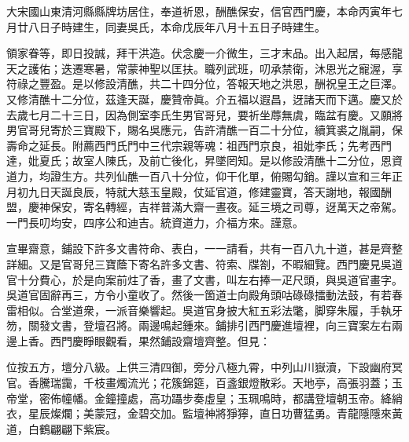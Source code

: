 \begin{myquote}[\markfont]
大宋國山東清河縣縣牌坊居住，奉道祈恩，酬醮保安，信官西門慶，本命丙寅年七月廿八日子時建生，同妻吳氏，本命戊辰年八月十五日子時建生。


領家眷等，即日投誠，拜干洪造。伏念慶一介微生，三才末品。出入起居，每感龍天之護佑；迭遷寒暑，常蒙神聖以匡扶。職列武班，叨承禁衛，沐恩光之寵渥，享符祿之豐盈。是以修設清醮，共二十四分位，答報天地之洪恩，酬祝皇王之巨澤。又修清醮十二分位，茲逢天誕，慶贊帝眞。介五福以遐昌，迓諸天而下邁。慶又於去歲七月二十三日，因為側室李氏生男官哥兒，要祈坐蓐無虞，臨盆有慶。又願將男官哥兒寄於三寶殿下，賜名吳應元，告許清醮一百二十分位，續箕裘之胤嗣，保壽命之延長。附薦西門氏門中三代宗親等魂：祖西門京良，祖妣李氏；先考西門達，妣夏氏；故室人陳氏，及前亡後化，昇墜罔知。是以修設清醮十二分位，恩資道力，均證生方。共列仙醮一百八十分位，仰干化單，俯賜勾銷。謹以宣和三年正月初九日天誕良辰，特就大慈玉皇殿，仗延官道，修建靈寶，答天謝地，報國酬盟，慶神保安，寄名轉經，吉祥普滿大齋一晝夜。延三境之司尊，迓萬天之帝駕。一門長叨均安，四序公和迪吉。統資道力，介福方來。謹意。
\end{myquote}

宣畢齋意，鋪設下許多文書符命、表白，一一請看，共有一百八九十道，甚是齊整詳細。又是官哥兒三寶蔭下寄名許多文書、符索、牒劄，不暇細覽。西門慶見吳道官十分費心，於是向案前炷了香，畫了文書，叫左右捧一疋尺頭，與吳道官畫字。吳道官固辭再三，方令小童收了。然後一箇道士向殿角頭咕碌碌擂動法鼓，有若春雷相似。合堂道衆，一派音樂響起。吳道官身披大紅五彩法氅，脚穿朱履，手執牙笏，關發文書，登壇召將。兩邊鳴起鍾來。鋪排引西門慶進壇裡，向三寶案左右兩邊上香。西門慶睜眼觀看，果然鋪設齋壇齊整。但見：

\begin{myquote}
位按五方，壇分八級。上供三清四御，旁分八極九霄，中列山川嶽瀆，下設幽府冥官。香騰瑞靄，千枝畫燭流光；花簇錦筵，百盞銀燈散彩。天地亭，高張羽蓋；玉帝堂，密佈幢幡。金鐘撞處，高功躡步奏虛皇；玉珮鳴時，都講登壇朝玉帝。絳綃衣，星辰燦爛；美蒙冠，金碧交加。監壇神將猙獰，直日功曹猛勇。青龍隱隱來黃道，白鶴翩翩下紫宸。
\end{myquote}

